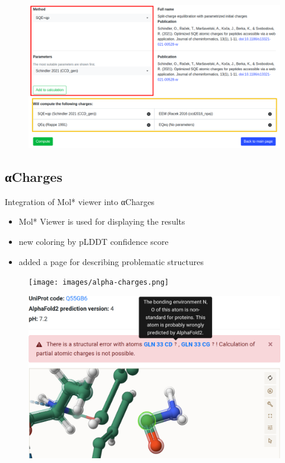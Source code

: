 \documentclass[
]{beamer}
\begin{document}
\begin{frame}
  \begin{figure}
    \includegraphics[width=1\textwidth,height=\textheight,keepaspectratio]{images/new_setup.png}
  \end{figure}
\end{frame}

\subsection[αCharges]{αCharges}

\begin{frame}{Integration of Mol* viewer into αCharges}
  \begin{itemize}
    \item Mol* Viewer is used for displaying the results
    \item new coloring by pLDDT confidence score
    \item added a page for describing problematic structures
  \end{itemize}
\end{frame}


\begin{frame}
  \begin{figure}
    \texttt{[image: images/alpha-charges.png]}
  \end{figure}
  \end{frame}

\begin{frame}
  \begin{figure}
    \includegraphics[width=1\textwidth,height=\textheight,keepaspectratio]{images/focus.png}
  \end{figure}
  \end{frame}
\end{document}
